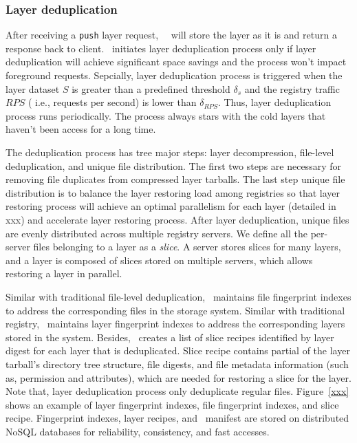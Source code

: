 \subsubsection{Layer deduplication}

After receiving a \texttt{push} layer request, \sysname~\dedupname~will store the layer as it is and return a response back to client. 
\dedupname~initiates layer deduplication process only if layer deduplication will achieve significant space savings and the process won't impact foreground requests. 
Sepcially, layer deduplication process is triggered when
the layer dataset $S$ is greater than a predefined threshold $\delta_{s}$ and the registry traffic $RPS$ ( i.e., requests per second) is lower than $\delta_{RPS}$. Thus, layer deduplication process runs periodically.
The process always stars with the cold layers that haven't been
access for a long time.
  
The deduplication process has tree major steps: layer decompression, file-level deduplication,
and unique file distribution. 
The first two steps are necessary for removing file duplicates from compressed layer tarballs.
The last step unique file distribution is to balance the layer restoring load among registries so that 
layer restoring process will achieve an optimal parallelism for each layer (detailed in xxx) and 
accelerate layer restoring process. 
After layer deduplication, unique files are evenly distributed across multiple registry servers. 
We define all the per-server files belonging to a layer as a {\em slice}. 
A server stores slices for many layers, and a layer is composed of slices stored on multiple servers, which allows restoring a layer in parallel. 

Similar with traditional file-level deduplication, \dedupname~maintains file fingerprint indexes to address the corresponding files in the storage system. 
Similar with traditional registry, \dedupname~maintains layer fingerprint indexes to address the corresponding layers stored in the system.
Besides, \dedupname~creates a list of slice recipes identified by layer digest for each layer that is deduplicated. 
Slice recipe contains partial of the layer tarball's directory tree structure, file digests, and file metadata information 
(such as, permission and attributes), which are needed for restoring a slice for the layer. Note that, layer deduplication process only deduplicate regular files.
Figure~\ref{xxx} shows an example of layer fingerprint indexes, file fingerprint indexes, and slice recipe.
Fingerprint indexes, layer recipes, and \sysname~manifest are stored on distributed NoSQL databases
for reliability, consistency, and fast accesses.

